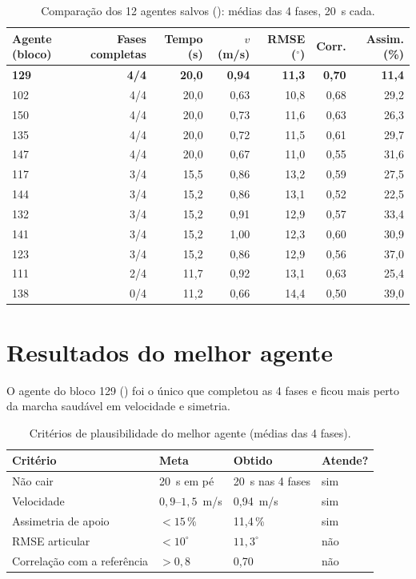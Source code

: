 \documentclass[11pt,a4paper]{article}
\begin{document}
\begin{table}[H]
\centering\small
\caption{Comparação dos 12 agentes salvos (\protect{}): médias das 4 fases, 20~s cada.}
\begin{tabular}{@{}lrrrrrr@{}}
\toprule
Agente (bloco) & Fases completas & Tempo (s) & $v$ (m/s) & RMSE ($^\circ$) & Corr. & Assim. (\%) \\ \midrule
\textbf{129} & \textbf{4/4} & \textbf{20,0} & \textbf{0,94} & \textbf{11,3} & \textbf{0,70} & \textbf{11,4} \\
102 & 4/4 & 20,0 & 0,63 & 10,8 & 0,68 & 29,2 \\
150 & 4/4 & 20,0 & 0,73 & 11,6 & 0,63 & 26,3 \\
135 & 4/4 & 20,0 & 0,72 & 11,5 & 0,61 & 29,7 \\
147 & 4/4 & 20,0 & 0,67 & 11,0 & 0,55 & 31,6 \\
117 & 3/4 & 15,5 & 0,86 & 13,2 & 0,59 & 27,5 \\
144 & 3/4 & 15,2 & 0,86 & 13,1 & 0,52 & 22,5 \\
132 & 3/4 & 15,2 & 0,91 & 12,9 & 0,57 & 33,4 \\
141 & 3/4 & 15,2 & 1,00 & 12,3 & 0,60 & 30,9 \\
123 & 3/4 & 15,2 & 0,86 & 12,9 & 0,56 & 37,0 \\
111 & 2/4 & 11,7 & 0,92 & 13,1 & 0,63 & 25,4 \\
138 & 0/4 & 11,2 & 0,66 & 14,4 & 0,50 & 39,0 \\
\bottomrule
\end{tabular}
\end{table}

\section{Resultados do melhor agente}
O agente do bloco 129 () foi o único que completou as 4 fases e ficou mais
perto da marcha saudável em velocidade e simetria.

\begin{table}[H]
\centering\small
\caption{Critérios de plausibilidade do melhor agente (médias das 4 fases).}
\label{tab:criterios}
\begin{tabular}{@{}llll@{}}
\toprule
Critério & Meta & Obtido & Atende? \\ \midrule
Não cair & 20~s em pé & 20~s nas 4 fases & sim \\
Velocidade & $0{,}9$--$1{,}5$~m/s & 0{,}94~m/s & sim \\
Assimetria de apoio & $<15\,\%$ & 11{,}4\,\% & sim \\
RMSE articular & $<10^\circ$ & $11{,}3^\circ$ & não \\
Correlação com a referência & $>0{,}8$ & 0{,}70 & não \\
\bottomrule
\end{tabular}
\end{table}
\end{document}
